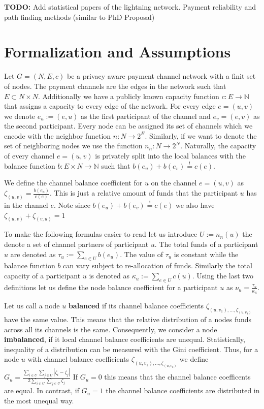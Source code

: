 \documentclass[a4paper]{paper}
\begin{document}
\textbf{TODO:} Add statistical papers of the lightning network. Payment reliability and path finding methods (similar to PhD Proposal)


\section{Formalization and Assumptions}
\label{sec:formalization}

Let $G=(N,E,c)$ be a privacy aware payment channel network with a finit set of nodes.
The payment channels are the edges in the network such that $E\subset N\times N$.
Additionally we have a publicly known capacity function $c: E\longrightarrow \mathbb{N}$ that assigns a capacity to every edge of the network.
For every edge $e=(u,v)$ we denote $e_u:=(e,u)$ as the first participant of the channel and $e_v=(e,v)$ as the second participant.
Every node can be assigned its set of channels which we encode with the neighbor function $n : N \longrightarrow 2^{E}$.
Similarly, if we want to denote the set of neighboring nodes we use the function $n_n : N \longrightarrow 2^{N}$.
Naturally, the capacity of every channel $e=(u,v)$ is privately split into the local balances with the balance function $b: E\times N\longrightarrow\mathbb{N}$ such that $b(e_u)+b(e_v)\stackrel{!}{=}c(e)$.

We define the channel balance coefficient for $u$ on the channel $e=(u,v)$ as  $\zeta_{(u,v)} = \frac{b(e_u)}{c(e)}$.
This is just a relative amount of funds that the participant $u$ has in the channel $e$.
Note since $b(e_u)+b(e_v)\stackrel{!}{=}c(e)$ we also have $\zeta_{(u,v)} + \zeta_{(v,u)}=1$

To make the following formulas easier to read let us introduce $U:=n_n(u)$ the denote a set of channel partners of participant $u$.
The total funds of a participant $u$ are denoted as $\tau_u:=\displaystyle{\sum_{e\in U}b(e_u)}$.
The value of $\tau_u$ is constant while the balance function $b$ can vary subject to re-allocation of funds.
Similarly the total capacity of a participant $u$ is denoted as $\kappa_u:=\displaystyle{\sum_{e\in U}c(u)}$.
Using the last two definitions let us define the node balance coefficient for a participant $u$ as $\nu_u = \frac{\tau_u}{\kappa_u}$.

Let us call a node $u$ {\bf balanced} if its channel balance coefficients $\zeta_{(u,v_1),\dots,\zeta_{(u,v_d)}}$ have the same value.
This means that the relative distribution of a nodes funds across all its channels is the same.
Consequently, we consider a node {\bf imbalanced}, if it local channel balance coefficients are unequal.
Statistically, inequality of a distribution can be measured with the Gini coefficient.
Thus, for a node $u$ with channel balance coefficients $\zeta_{(u,v_1),\dots,\zeta_{(u,v_d)}}$ we define $G_u = \frac{\displaystyle{\sum_{i\in U} \sum_{j \in U}} | \zeta_i - \zeta_j |}{2 \displaystyle{\sum_{i \in U} \sum_{j \in U} \zeta_j}}$
If $G_u = 0$ this means that the channel balance coefficents are equal.
In contrast, if $G_u = 1$ the channel balance coefficients are distributed in the most unequal way.
\end{document}
